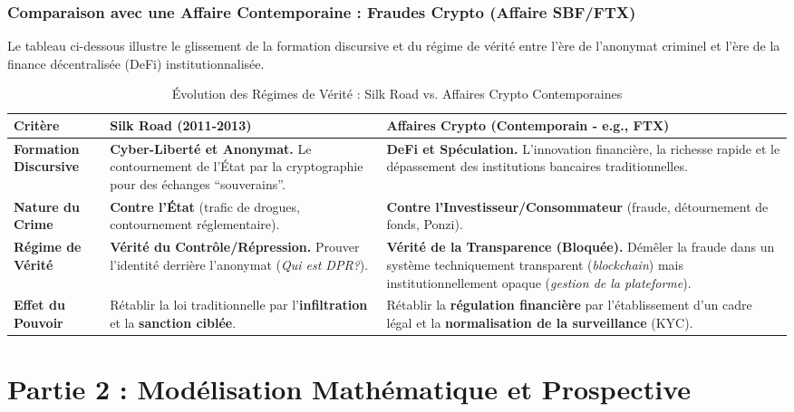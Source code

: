 \documentclass[a4paper,12pt]{report}
\begin{document}
	\subsection*{Comparaison avec une Affaire Contemporaine : Fraudes Crypto (Affaire SBF/FTX)}
	Le tableau ci-dessous illustre le glissement de la formation discursive et du régime de vérité entre l'ère de l'anonymat criminel et l'ère de la finance décentralisée (DeFi) institutionnalisée.
	\begin{table}[h]
		\centering
		\caption{Évolution des Régimes de Vérité : Silk Road vs. Affaires Crypto Contemporaines}
		\label{tab:comparaison}
		\begin{tabular}{|l|p{5.5cm}|p{5.5cm}|}
			\hline
			\textbf{Critère} & \textbf{Silk Road (2011-2013)} & \textbf{Affaires Crypto (Contemporain - e.g., FTX)} \\
			\hline
			\textbf{Formation Discursive} & \textbf{Cyber-Liberté et Anonymat.} Le contournement de l'État par la cryptographie pour des échanges ``souverains''. & \textbf{DeFi et Spéculation.} L'innovation financière, la richesse rapide et le dépassement des institutions bancaires traditionnelles. \\
			\hline
			\textbf{Nature du Crime} & \textbf{Contre l'État} (trafic de drogues, contournement réglementaire). & \textbf{Contre l'Investisseur/Consommateur} (fraude, détournement de fonds, Ponzi). \\
			\hline
			\textbf{Régime de Vérité} & \textbf{Vérité du Contrôle/Répression.} Prouver l'identité derrière l'anonymat (\textit{Qui est DPR?}). & \textbf{Vérité de la Transparence (Bloquée).} Démêler la fraude dans un système techniquement transparent (\textit{blockchain}) mais institutionnellement opaque (\textit{gestion de la plateforme}). \\
			\hline
			\textbf{Effet du Pouvoir} & Rétablir la loi traditionnelle par l'\textbf{infiltration} et la \textbf{sanction ciblée}. & Rétablir la \textbf{régulation financière} par l'établissement d'un cadre légal et la \textbf{normalisation de la surveillance} (KYC). \\
			\hline
		\end{tabular}
	\end{table}
	
	\chapter{Partie 2 : Modélisation Mathématique et Prospective}
	
\end{document}
